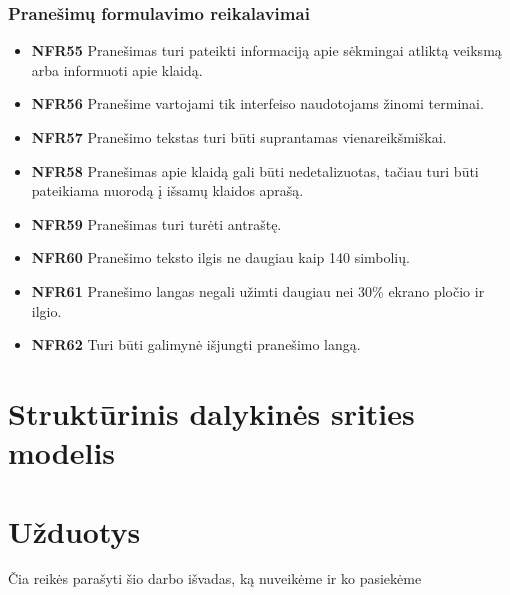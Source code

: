 \documentclass{VUMIFPSbakalaurinis}
\begin{document}
\subsubsection{Pranešimų formulavimo reikalavimai}
\begin{itemize}
	\item \textbf{NFR55} Pranešimas turi pateikti informaciją apie sėkmingai atliktą veiksmą arba informuoti apie klaidą.
	\item \textbf{NFR56} Pranešime vartojami tik interfeiso naudotojams žinomi terminai.
	\item \textbf{NFR57} Pranešimo tekstas turi būti suprantamas vienareikšmiškai.
	\item \textbf{NFR58} Pranešimas apie klaidą gali būti nedetalizuotas, tačiau turi būti pateikiama nuorodą į išsamų klaidos aprašą.
	\item \textbf{NFR59} Pranešimas turi turėti antraštę.
	\item \textbf{NFR60} Pranešimo teksto ilgis ne daugiau kaip 140 simbolių.
	\item \textbf{NFR61} Pranešimo langas negali užimti daugiau nei 30\% ekrano pločio ir ilgio.
	\item \textbf{NFR62} Turi būti galimynė išjungti pranešimo langą.
\end{itemize}

\section{Struktūrinis dalykinės srities modelis}

\section{Užduotys}

Čia reikės parašyti šio darbo išvadas, ką nuveikėme ir ko pasiekėme

\printbibliography[heading=bibintoc]  %
\end{document}

